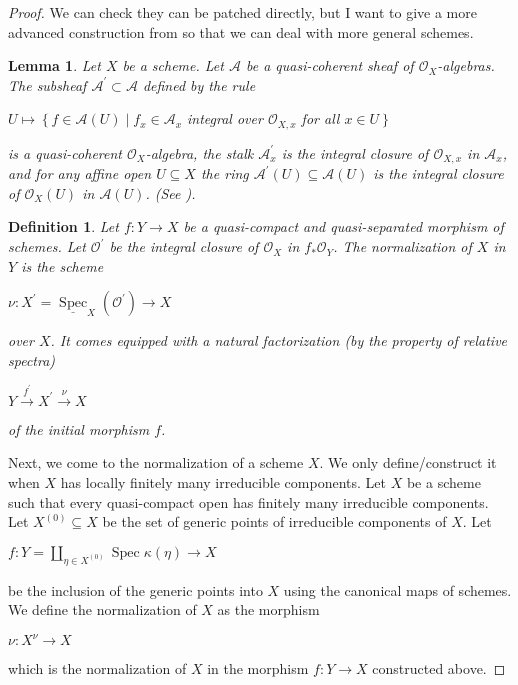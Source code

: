 \documentclass[12pt]{amsart}
\newtheorem{defn}[theorem]{Definition}
\newtheorem{lm}[theorem]{Lemma}
\begin{document}
\begin{proof}
We can check they can be patched directly,  but I want to give a more advanced construction from \cite{stacks-project} so that we can deal with more general schemes. 
\begin{lm}
 Let $X$ be a scheme. Let $\mathcal{A}$ be a quasi-coherent sheaf of $\mathcal{O}_{X}$-algebras.  The subsheaf $\mathcal{A}^{\prime} \subset \mathcal{A}$ defined by the rule
\begin{center}
$U \longmapsto\left\{f \in \mathcal{A}(U) \mid f_{x} \in \mathcal{A}_{x}\right.$ integral over $\mathcal{O}_{X, x}$ for all $\left.x \in U\right\}$
\end{center}
is a quasi-coherent $\mathcal{O}_{X}$-algebra, the stalk $\mathcal{A}_{x}^{\prime}$ is the integral closure of $\mathcal{O}_{X, x}$ in $\mathcal{A}_{x}$, and for any affine open $U \subseteq X$ the ring $\mathcal{A}^{\prime}(U) \subseteq \mathcal{A}(U)$ is the integral closure of $\mathcal{O}_{X}(U)$ in $\mathcal{A}(U)$.   \emph{(See \cite[\href{https://stacks.math.columbia.edu/tag/035F}{Tag 035F}]{stacks-project}).}
\end{lm}
\begin{defn}
Let $f: Y \rightarrow X$ be a quasi-compact and quasi-separated morphism of schemes. Let $\mathcal{O}^{\prime}$ be the integral closure of $\mathcal{O}_{X}$ in $f_{*} \mathcal{O}_{Y}$. The normalization of $X$ in $Y$ is the scheme 
\begin{center}
$\nu: X^{\prime}=\underline{\operatorname{Spec}}_{X}\left(\mathcal{O}^{\prime}\right) \rightarrow X$
\end{center}
over $X$.  It comes equipped with a natural factorization (by the property of relative spectra)
\begin{center}
$Y \stackrel{f^{\prime}}{\longrightarrow} X^{\prime} \stackrel{\nu}{\rightarrow} X$
\end{center}
of the initial morphism $f$.
\end{defn}
Next, we come to the normalization of a scheme $X .$ We only define/construct it when $X$ has locally finitely many irreducible components. Let $X$ be a scheme such that every quasi-compact open has finitely many irreducible components. Let $X^{(0)} \subseteq X$ be the set of generic points of irreducible components of $X .$ Let
\begin{center}
$f: Y=\coprod_{\eta \in X^{(0)}} \operatorname{Spec}\kappa(\eta) \longrightarrow X$
\end{center}
be the inclusion of the generic points into $X$ using the canonical maps of schemes.  
We define the normalization of $X$ as the morphism
\begin{center}
$\nu: X^{\nu} \rightarrow X$
\end{center}
which is the normalization of $X$ in the morphism $f: Y \rightarrow X$ constructed above.


\end{proof}
\end{document}
